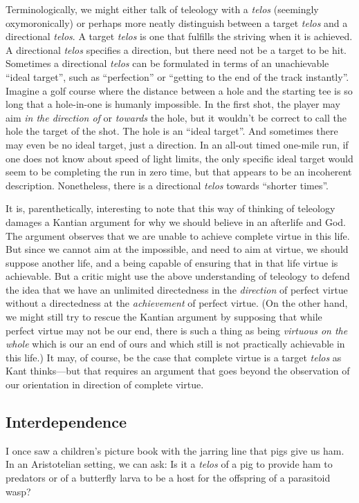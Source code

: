 Terminologically, we might either talk of teleology with a \textit{telos} (seemingly oxymoronically) or perhaps
more neatly distinguish between a target \textit{telos} and a directional \textit{telos}. A target \textit{telos} is
one that fulfills the striving when it is achieved. A directional \textit{telos} specifies a direction, but there need
not be a target to be hit. Sometimes a directional \textit{telos} can be formulated in terms of an unachievable 
``ideal target'', such as ``perfection'' or ``getting to the end of the track instantly''.  Imagine a golf course 
where the distance between a hole and the starting tee is so long that  a hole-in-one is humanly impossible. In the
first shot, the player may aim \textit{in the direction of} or \textit{towards} the hole, but it wouldn't be correct
to call the hole the target of the shot. The hole is an ``ideal target''. And sometimes there may even be no ideal target, just a direction. In an all-out timed one-mile run, if one 
does not know about speed of light limits, the only specific ideal target would seem to be completing the run in zero
time, but that appears to be an incoherent description. Nonetheless, there is a directional \textit{telos} towards 
``shorter times''.

It is, parenthetically, interesting to note that this way of thinking of teleology damages a Kantian argument for why we should believe in 
an afterlife and God. The argument observes that we are unable to achieve complete virtue in this life. But since we cannot aim at
the impossible, and need to aim at virtue, we should suppose another life, and a being capable of ensuring that in that life virtue
is achievable. But a critic might use the above understanding of teleology to defend the idea that we have an unlimited 
directedness in the \textit{direction} of perfect virtue without a directedness at the \textit{achievement} of perfect virtue. (On the other 
hand, we might still try to rescue the Kantian argument by supposing that while perfect virtue may not be our end, 
there is such a thing as being \textit{virtuous on the whole} which is our an end of ours and which still is not
practically achievable in this life.) It may, of course, be the case that complete virtue is a target \textit{telos} as
Kant thinks---but that requires an argument that goes beyond the observation of our orientation in direction of
complete virtue.

\subsection{Interdependence}
I once saw a children's picture book with the
jarring line that pigs give us ham. In an Aristotelian setting, we can ask: Is it a \textit{telos} of a pig
to provide ham to predators or of a butterfly larva to be a host for the offspring of a parasitoid wasp? 

